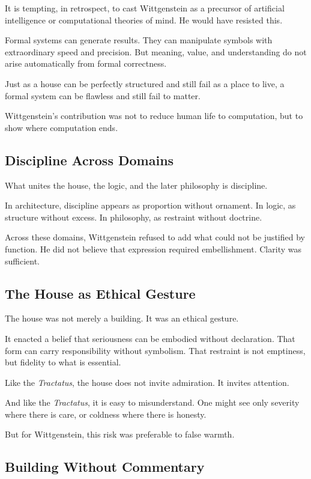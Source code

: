 \documentclass[11pt]{article}
\begin{document}
It is tempting, in retrospect, to cast Wittgenstein as a precursor of artificial intelligence or computational theories of mind. He would have resisted this.

Formal systems can generate results. They can manipulate symbols with extraordinary speed and precision. But meaning, value, and understanding do not arise automatically from formal correctness.

Just as a house can be perfectly structured and still fail as a place to live, a formal system can be flawless and still fail to matter.

Wittgenstein’s contribution was not to reduce human life to computation, but to show where computation ends.

\subsection*{Discipline Across Domains}

What unites the house, the logic, and the later philosophy is discipline.

In architecture, discipline appears as proportion without ornament.  
In logic, as structure without excess.  
In philosophy, as restraint without doctrine.

Across these domains, Wittgenstein refused to add what could not be justified by function. He did not believe that expression required embellishment. Clarity was sufficient.

\subsection*{The House as Ethical Gesture}

The house was not merely a building. It was an ethical gesture.

It enacted a belief that seriousness can be embodied without declaration. That form can carry responsibility without symbolism. That restraint is not emptiness, but fidelity to what is essential.

Like the \emph{Tractatus}, the house does not invite admiration. It invites attention.

And like the \emph{Tractatus}, it is easy to misunderstand. One might see only severity where there is care, or coldness where there is honesty.

But for Wittgenstein, this risk was preferable to false warmth.

\subsection*{Building Without Commentary}
\end{document}
